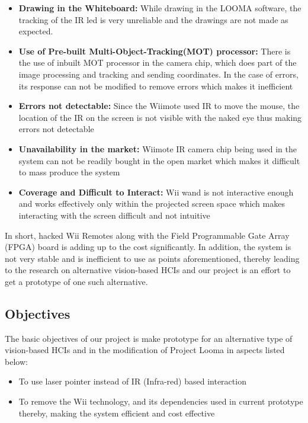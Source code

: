 \documentclass[12pt, a4paper]{article}
\begin{document}
\begin{itemize}
\item \textbf {Drawing in the Whiteboard:} While drawing in the LOOMA software, the tracking of the IR led is very unreliable and the drawings are not made as expected.
\item \textbf{Use of Pre-built Multi-Object-Tracking(MOT) processor:} There is the use of inbuilt MOT processor in the camera chip, which does part of the image processing and tracking and sending coordinates. In the case of errors, its response can not be modified to remove errors which makes it inefficient
\item \textbf{Errors not detectable:} Since the Wiimote used IR to move the mouse, the location of the IR on the screen is not visible with the naked eye thus making errors not detectable 
\item \textbf{Unavailability in the market:} Wiimote IR camera chip being used in the system can not be readily bought in the open market which makes it difficult to mass produce the system
\item \textbf{Coverage and Difficult to Interact:} Wii wand is not interactive enough and works effectively only within the projected screen space which makes interacting with the screen difficult and not intuitive
\end{itemize}

In short, hacked Wii Remotes along with the Field Programmable Gate Array (FPGA) board is adding up to the cost significantly. In addition, the system is not very stable and is inefficient to use as points aforementioned, thereby leading to the research on alternative vision-based HCIs and our project is an effort to get
a prototype of one such alternative.

\subsection{Objectives}
The basic objectives of our project is make prototype for an alternative type of vision-based HCIs and in the modification of Project Looma in aspects listed below:
\begin{itemize}
	\item To use laser pointer instead of IR (Infra-red) based interaction
	\item To remove the Wii technology, and its dependencies used in current prototype thereby, making the system efficient and cost effective
\end{itemize}
\end{document}
